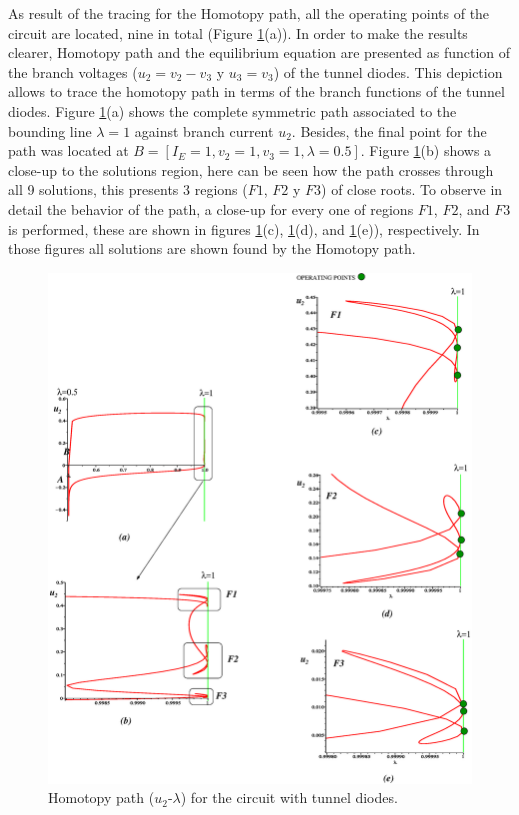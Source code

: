 \documentclass[journal,twocolumn]{IEEEtran}
\begin{document}
As result of the tracing for the Homotopy path, all the operating points of the circuit are located, nine
in total (Figure \ref{2tunelg}(a)). In order to make the results clearer, Homotopy path and the equilibrium equation are presented
as function of the branch voltages ($u_2=v_2-v_3$ y $u_3=v_3$) of the tunnel diodes. This depiction
allows to trace the homotopy path in terms of the branch functions of the tunnel diodes.
Figure \ref{2tunelg}(a) shows the complete symmetric
path associated to the bounding line $\lambda = 1$ against branch current $u_2$.
Besides, the final point for the path was located at $B=[I_E=1,v_2=1,v_3=1, \lambda=0.5]$. Figure \ref{2tunelg}(b) shows a close-up to the solutions region, here can be seen how the path crosses through all 9 solutions, this presents 3 regions ($F1$, $F2$ y $F3$) of close roots. To observe in detail the behavior of the path, a close-up for every one of regions $F1$, $F2$, and $F3$ is performed, these are shown in figures \ref{2tunelg}(c), \ref{2tunelg}(d), and \ref{2tunelg}(e)), respectively. In those figures all solutions are shown found by the Homotopy path.
 
\begin{figure}[hbtp]
\centering
\includegraphics[scale=0.3]{nh3figs/diodos/diodo.eps}
\caption{Homotopy path ($u_2$-$\lambda$) for the circuit with tunnel diodes.}
\label{2tunelg}
\end{figure}
\end{document}
